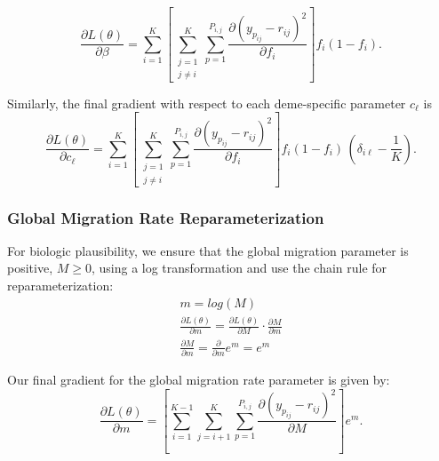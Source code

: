 \documentclass[a4paper, 12pt]{article}
\begin{document}
\begin{equation}
    \label{final_fib_grad}
    \frac{\partial L(\theta)}{\partial \beta}
    = \sum_{i=1}^K
      \left[
        \sum_{\substack{j=1 \\ j\neq i}}^K
        \sum_{p=1}^{P_{i,j}}
        \frac{\partial (y_{p_{ij}} - r_{ij})^2}{\partial f_i}
      \right]
      f_i (1-f_i).
\end{equation}


\vspace{8mm}

\noindent Similarly, the final gradient with respect to each deme-specific parameter $c_\ell$ is
\begin{equation}
    \label{final_fic_grad}
    \frac{\partial L(\theta)}{\partial c_\ell}
    = \sum_{i=1}^K
      \left[
        \sum_{\substack{j=1 \\ j\neq i}}^K
        \sum_{p=1}^{P_{i,j}}
        \frac{\partial (y_{p_{ij}} - r_{ij})^2}{\partial f_i}
      \right]
      f_i (1-f_i)\,
      \left(\delta_{i\ell} - \frac{1}{K}\right).
\end{equation}

\vspace{8mm}

\subsubsection{Global Migration Rate Reparameterization}
For biologic plausibility, we ensure that the global migration parameter is positive, $M \geq 0$, using a log transformation and use the chain rule for reparameterization:
\begin{align}
    \label{eq_loss_M_reparam}
    m = log(M) \\
    \frac{\partial L(\theta)}{\partial m} =  \frac{\partial L(\theta)}{\partial M} \cdot \frac{\partial M}{\partial m} \\
    \frac{\partial M}{\partial m} = \frac{\partial}{\partial m} e^m = e^m
\end{align}


\vspace{6mm}

Our final gradient for the global migration rate parameter is given by:
\begin{equation}
    \label{final_M_gradient}
    \frac{\partial L(\theta)}{\partial m}
    = \left[
        \sum_{i=1}^{K-1} \sum_{j=i+1}^K \sum_{p=1}^{P_{i,j}}
        \frac{\partial (y_{p_{ij}} - r_{ij})^2}{\partial M}
      \right] e^m.
\end{equation}
\end{document}
